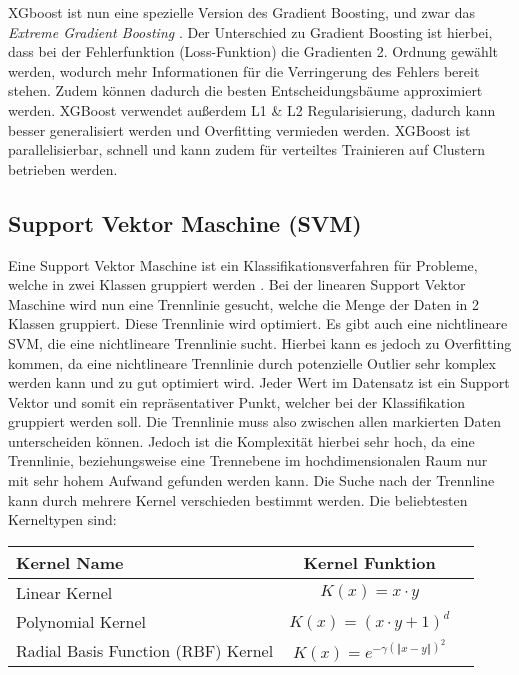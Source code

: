 XGboost ist nun eine spezielle Version des Gradient Boosting, und zwar das \textit{Extreme Gradient Boosting} \cite{chenXGBoostScalableTree2016}.
Der Unterschied zu Gradient Boosting ist hierbei, dass bei der Fehlerfunktion (Loss-Funktion) die Gradienten 2. Ordnung gewählt werden, wodurch mehr Informationen für die Verringerung des Fehlers bereit stehen.
Zudem können dadurch die besten Entscheidungsbäume approximiert werden. 
XGBoost verwendet außerdem L1 \& L2 Regularisierung, dadurch kann besser generalisiert werden und Overfitting vermieden werden.
XGBoost ist parallelisierbar, schnell und kann zudem für verteiltes Trainieren auf Clustern betrieben werden.

\subsection{Support Vektor Maschine (SVM)}
\label{ch:Basics:se:ml:ss:svm}
Eine Support Vektor Maschine ist ein Klassifikationsverfahren für Probleme, welche in zwei Klassen gruppiert werden \cite{cortesSupportvectorNetworks1995}.
Bei der linearen Support Vektor Maschine wird nun eine {\glqq Trennlinie\grqq} gesucht, welche die Menge der Daten in 2 Klassen gruppiert. 
Diese Trennlinie wird optimiert.
Es gibt auch eine nichtlineare SVM, die eine nichtlineare Trennlinie sucht.
Hierbei kann es jedoch zu Overfitting kommen, da eine nichtlineare Trennlinie durch potenzielle Outlier sehr komplex werden kann und zu {\glqq gut\grqq} optimiert wird.
Jeder Wert im Datensatz ist ein Support Vektor und somit ein repräsentativer Punkt, welcher bei der Klassifikation gruppiert werden soll.
Die Trennlinie muss also zwischen allen markierten Daten unterscheiden können.
Jedoch ist die Komplexität hierbei sehr hoch, da eine Trennlinie, beziehungsweise eine Trennebene im hochdimensionalen Raum nur mit sehr hohem Aufwand gefunden werden kann.
Die Suche nach der Trennline kann durch mehrere Kernel verschieden bestimmt werden.
Die beliebtesten Kerneltypen sind:

\begin{center}
    \begin{tabular}{ | l | c | r | }
        \hline
        Kernel Name & Kernel Funktion \\ \hline
        Linear Kernel & $K(x)=x \cdot y$ \\ 
        Polynomial Kernel & $K(x)=(x\cdot y+1)^d$ \\
        Radial Basis Function (RBF) Kernel & $K(x)=e^{-\gamma(\Vert x-y \Vert)^2}$ \\
        \hline
    \end{tabular}
\end{center}

